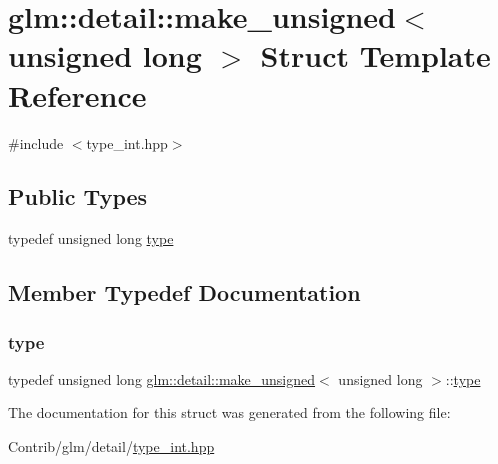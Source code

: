 \hypertarget{structglm_1_1detail_1_1make__unsigned_3_01unsigned_01long_01_4}{}\section{glm\+:\+:detail\+:\+:make\+\_\+unsigned$<$ unsigned long $>$ Struct Template Reference}
\label{structglm_1_1detail_1_1make__unsigned_3_01unsigned_01long_01_4}


{\ttfamily \#include $<$type\+\_\+int.\+hpp$>$}

\subsection*{Public Types}
\begin{DoxyCompactItemize}
\item 
typedef unsigned long \mbox{\hyperlink{structglm_1_1detail_1_1make__unsigned_3_01unsigned_01long_01_4_a8894ccd179135bda131b42cf10e58362}{type}}
\end{DoxyCompactItemize}


\subsection{Member Typedef Documentation}
\mbox{\label{structglm_1_1detail_1_1make__unsigned_3_01unsigned_01long_01_4_a8894ccd179135bda131b42cf10e58362}} 
\subsubsection{\texorpdfstring{type}{type}}
{\footnotesize\ttfamily typedef unsigned long \mbox{\hyperlink{structglm_1_1detail_1_1make__unsigned}{glm\+::detail\+::make\+\_\+unsigned}}$<$ unsigned long $>$\+::\mbox{\hyperlink{structglm_1_1detail_1_1make__unsigned_3_01unsigned_01long_01_4_a8894ccd179135bda131b42cf10e58362}{type}}}



The documentation for this struct was generated from the following file\+:\begin{DoxyCompactItemize}
\item 
Contrib/glm/detail/\mbox{\hyperlink{type__int_8hpp}{type\+\_\+int.\+hpp}}\end{DoxyCompactItemize}
